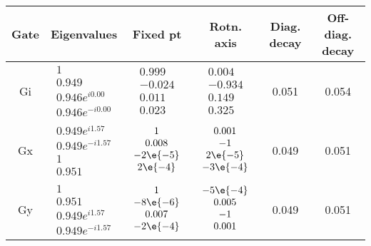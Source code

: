 {\begin{table}[h]
\begin{center}
\begin{tabular}[l]{|c|c|c|c|c|c|}
\hline
Gate & Eigenvalues & Fixed pt & Rotn. axis & Diag. decay & Off-diag. decay \\ \hline
Gi & $ \begin{array}{c}
1 \\ 
0.949 \\ 
0.946e^{i0.00} \\ 
0.946e^{-i0.00}
 \end{array} $
 & $ \begin{array}{c}
0.999 \\ 
-0.024 \\ 
0.011 \\ 
0.023
 \end{array} $
 & $ \begin{array}{c}
0.004 \\ 
-0.934 \\ 
0.149 \\ 
0.325
 \end{array} $
 & 0.051 & 0.054 \\ \hline
Gx & $ \begin{array}{c}
0.949e^{i1.57} \\ 
0.949e^{-i1.57} \\ 
1 \\ 
0.951
 \end{array} $
 & $ \begin{array}{c}
1 \\ 
0.008 \\ 
-2\e{-5} \\ 
2\e{-4}
 \end{array} $
 & $ \begin{array}{c}
0.001 \\ 
-1 \\ 
2\e{-5} \\ 
-3\e{-4}
 \end{array} $
 & 0.049 & 0.051 \\ \hline
Gy & $ \begin{array}{c}
1 \\ 
0.951 \\ 
0.949e^{i1.57} \\ 
0.949e^{-i1.57}
 \end{array} $
 & $ \begin{array}{c}
1 \\ 
-8\e{-6} \\ 
0.007 \\ 
-2\e{-4}
 \end{array} $
 & $ \begin{array}{c}
-5\e{-4} \\ 
0.005 \\ 
-1 \\ 
0.001
 \end{array} $
 & 0.049 & 0.051 \\ \hline
\end{tabular}


\end{center}
\end{table}}
